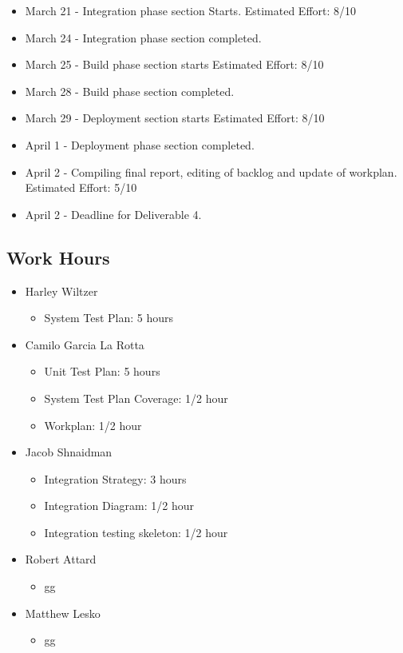 \documentclass[12pt]{article}
\begin{document}
\begin{itemize}
    \item March 21 - Integration phase section Starts. Estimated Effort: 8/10
    \item March 24 - Integration phase section completed. 
    \item March 25 - Build phase section starts Estimated Effort: 8/10
    \item March 28 - Build phase section completed.
    \item March 29 - Deployment section starts Estimated Effort: 8/10
    \item April 1 - Deployment phase section completed. 
    \item April 2 - Compiling final report, editing of backlog and update of workplan. Estimated Effort: 5/10
    \item April 2 - Deadline for Deliverable 4. 

\end{itemize}
%
 \subsection{Work Hours}
%
 \begin{itemize}
     \item Harley Wiltzer
 		\begin{itemize}
 			\item System Test Plan: 5 hours
 		\end{itemize}
     \item Camilo Garcia La Rotta
 		\begin{itemize}
 			\item Unit Test Plan: 5 hours
 			\item System Test Plan Coverage: 1/2 hour
 			\item Workplan: 1/2 hour
 		\end{itemize}
     \item Jacob Shnaidman
     \begin{itemize}
         \item Integration Strategy: 3 hours
	 \item Integration Diagram: 1/2 hour
	 \item Integration testing skeleton: 1/2 hour
     \end{itemize}
     \item Robert Attard
     \begin{itemize}
     	\item gg
     \end{itemize}
     \item Matthew Lesko
     \begin{itemize}
     	\item gg
     \end{itemize}
 \end{itemize}
\end{document}
